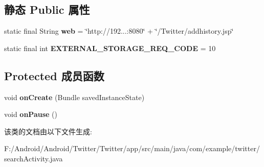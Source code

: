 \subsection*{静态 Public 属性}
\begin{DoxyCompactItemize}
\item 
\mbox{\label{classcom_1_1example_1_1twitter_1_1search_activity_a617445bb402d5c1872a86fb72ef0a98d}} 
static final String {\bfseries web} = \char`\"{}http\+://192...\+:8080\char`\"{} + \char`\"{}/Twitter/addhistory.\+jsp\char`\"{}
\item 
\mbox{\label{classcom_1_1example_1_1twitter_1_1search_activity_ab1bb362889610cafee17a8a04d9081cf}} 
static final int {\bfseries E\+X\+T\+E\+R\+N\+A\+L\+\_\+\+S\+T\+O\+R\+A\+G\+E\+\_\+\+R\+E\+Q\+\_\+\+C\+O\+DE} = 10
\end{DoxyCompactItemize}
\subsection*{Protected 成员函数}
\begin{DoxyCompactItemize}
\item 
\mbox{\label{classcom_1_1example_1_1twitter_1_1search_activity_aca8163624b7db3753ff533fcf3795659}} 
void {\bfseries on\+Create} (Bundle saved\+Instance\+State)
\item 
\mbox{\label{classcom_1_1example_1_1twitter_1_1search_activity_a11a6b46f5715f3cf42d861d7f97b3552}} 
void {\bfseries on\+Pause} ()
\end{DoxyCompactItemize}


该类的文档由以下文件生成\+:\begin{DoxyCompactItemize}
\item 
F\+:/\+Android/\+Android/\+Twitter/\+Twitter/app/src/main/java/com/example/twitter/search\+Activity.\+java\end{DoxyCompactItemize}
